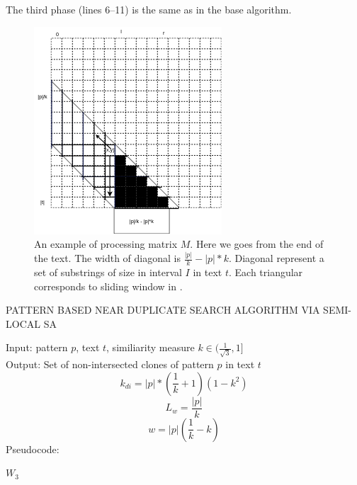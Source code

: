 The third phase (lines 6--11) is the same as in the base algorithm.

 
\begin{figure}
	\centering
   \includegraphics[width=0.4\columnwidth]{figures/M2.png}
   \caption{An example of processing matrix $M$.
   Here we goes from the end of the text. The width of diagonal is $\frac{|p|}{k} - |p|*k$.
Diagonal represent a set of substrings  of size in interval $I$ in text $t$.
Each triangular corresponds to sliding window in \cite{luciv2019interactive}.   
   }\label{M2}
\end{figure}




\begin{algorithm}[!t]
\caption{PATTERN BASED NEAR DUPLICATE
SEARCH ALGORITHM VIA SEMI-LOCAL SA}
\label{alg:patternMathing1}
Input: pattern $p$, text $t$, similiarity measure $k \in  ( \frac{1}{\sqrt{3}} ,1  ]$\\
Output: Set of non-intersected clones of pattern $p$ in text $t$
\begin{equation}
    k_{di}=|p|*(\frac{1}{k}+1)(1-k^2)
\end{equation}
\begin{equation}
 L_{w} = \frac{|p|} {k}
\end{equation}
\begin{equation}
  w = |p|(\frac{1}{k} - k)
\end{equation}
Pseudocode:
\begin{algorithmic}[1]
\ENDIF
\ENDFOR
\RETURN $W_3$
\end{algorithmic}
\end{algorithm}

